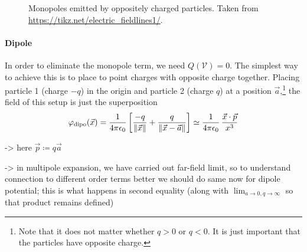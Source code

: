 \documentclass[../class_mech_main.tex]{subfiles}
\DeclareMathOperator{\fpeps}{\frac{1}{4 \pi \epsilon_0}}
\begin{document}
\begin{figure}
    \centering

    \hspace*{0.1\textwidth}%

    \caption{Monopoles emitted by oppositely charged particles. Taken from \url{https://tikz.net/electric_fieldlines1/}.}
    \label{fig:monopoles}
\end{figure}



            \paragraph{Dipole}
In order to eliminate the monopole term, we need $Q(\mathcal{V}) = 0$. The simplest way to achieve this is to place to point charges with opposite charge together. Placing particle 1 (charge $-q$) in the origin and particle 2 (charge $q$) at a position $\vec{a}$,\footnote{Note that it does not matter whether $q > 0$ or $q < 0$. It is just important that the particles have opposite charge.} the field of this setup is just the superposition
\begin{equation}
    \varphi_\mathrm{dipo}(\vec{x})
    = \fpeps \qty[\frac{-q}{\norm{\vec{x}}} + \frac{q}{\norm{\vec{x} - \vec{a}}}]
    \simeq \fpeps \frac{\vec{x} \cdot \vec{p}}{x^3}
\end{equation}

-> here $\vec{p} \coloneqq q \vec{a}$


-> in multipole expansion, we have carried out far-field limit, so to understand connection to different order terms better we should do same now for dipole potential; this is what happens in second equality (along with $\lim_{a \rightarrow 0, q \rightarrow \infty}$ so that product remains defined)
\end{document}
